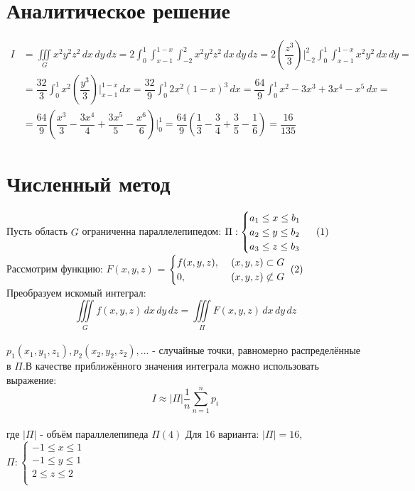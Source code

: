 \documentclass[12pt, a4paper ]{article}
\begin{document}
\section{\large Аналитическое решение}
\begin{equation}
\begin{split}
I &= \iiint\limits_G  x^2y^2z^2 \,dx\,dy\,dz =  2\int_{0}^{1}\int_{x-1}^{1-x}\int_{-2}^{2} x^2y^2z^2 \,dx\,dy\,dz = 2\left(\dfrac{z^3}{3}\right)\Big|_{-2}^{2}\int_{0}^{1}\int_{x-1}^{1-x} x^2y^2 \,dx\,dy = \\[10pt] &= \dfrac{32}{3}\int_{0}^{1} x^2\left(\dfrac{y^3}{3}\right)\Big|_{x-1}^{1-x} \,dx = \dfrac{32}{9}\int_{0}^{1} 2x^2\left(1-x\right)^3 \,dx = \dfrac{64}{9} \int_{0}^{1} x^2 -3x^3 + 3x^4 - x^5 \,dx = \\[10pt] & = \dfrac{64}{9}\left(\dfrac{x^3}{3} - \dfrac{3x^4}{4} + \dfrac{3x^5}{5} - \dfrac{x^6}{6}\right)\Big|_{0}^{1} = \dfrac{64}{9}\left(\dfrac{1}{3} - \dfrac{3}{4} + \dfrac{3}{5} - \dfrac{1}{6}\right)  = \dfrac{16}{135}
\end{split}
\end{equation}
\section{\large Численный метод}
Пусть область $G$ ограниченна параллелепипедом:  
$
\Pi :
 \begin{cases}
   a_1 \leq x \leq b_1\\
   a_2 \leq y \leq b_2\\
   a_3 \leq z \leq b_3\\
   \end{cases}
~\refstepcounter{equation}(\theequation)
$
\\[10pt]
Рассмотрим функцию: $F(x, y, z)$ = 
$
   \begin{cases}
   f(x, y, z),~&(x, y, z) \subset G\\
   0,~&(x, y, z) \not\subset G\\
 \end{cases}
 ~\refstepcounter{equation}(\theequation)
$
\\[10pt]
Преобразуем искомый интеграл:
\begin{equation*}
\iiint\limits_G  f(x, y, z) \,dx\,dy\,dz = \iiint\limits_\Pi  F(x, y, z) \,dx\,dy\,dz 
\end{equation*}\\
$p_1(x_1, y_1, z_1), p_2(x_2, y_2, z_2), . . .$ - случайные точки, равномерно распределённые в $\Pi$.В качестве приближённого значения
интеграла можно использовать выражение:  
\begin{equation}
I \approx |\Pi| \dfrac{1}{n} \sum_{n=1}^{n} p_i
\end{equation}\\
где $|\Pi|$ - объём параллелепипеда $\Pi (4)$
\newpage
Для 16 варианта: $|\Pi| = 16$,~
$
\Pi :
 \left\{\begin{aligned}
   -1 \leq x \leq 1\\
   -1 \leq y \leq 1\\
    2 \leq z \leq 2\\
   \end{aligned}\right.
$
\end{document}
